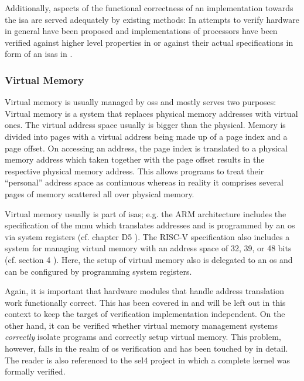 Additionally, aspects of the functional correctness of an implementation towards the \gls{isa} are served adequately by existing methods:
In \cite{Mukherjee16} attempts to verify hardware in general have been proposed and implementations of processors have been verified against higher level properties in \cite{Zhang15, Beatty94, Berezin98, Trippel19} or against their actual specifications in form of an \glspl{isa} in \cite{Burch94, Reid16, RISCV-formal}.

\subsubsection{Virtual Memory}
\label{sec:virtual-memory}

Virtual memory is usually managed by \glspl{os} and mostly serves two purposes: 
Virtual memory is a system that replaces physical memory addresses with virtual ones.
The virtual address space usually is bigger than the physical.
Memory is divided into pages with a virtual address being made up of a page index and a page offset.
On accessing an address, the page index is translated to a physical memory address which taken together with the page offset results in the respective physical memory address.
This allows programs to treat their \enquote{personal} address space as continuous whereas in reality it comprises several pages of memory scattered all over physical memory.

Virtual memory usually is part of \glspl{isa}; e.g. the ARM architecture includes the specification of the \gls{mmu} which translates addresses and is programmed by an \gls{os} via system registers (cf. chapter D5 \cite{Armv8}).
The RISC-V specification also includes a system for managing virtual memory with an address space of 32, 39, or 48 bits (cf. section 4 \cite{RiscVISAP}).
Here, the setup of virtual memory also is delegated to an \gls{os} and can be configured by programming system registers.

Again, it is important that hardware modules that handle address translation work functionally correct.
This has been covered in \cite{Dalinger05} and will be left out in this context to keep the target of verification implementation independent.
On the other hand, it can be verified whether virtual memory management systems \textit{correctly} isolate programs and correctly setup virtual memory.
This problem, however, falls in the realm of \gls{os} verification and has been touched by \cite{Vaynberg12} in detail.
The reader is also referenced to the sel4 project \cite{Klein09} in which a complete kernel was formally verified.

